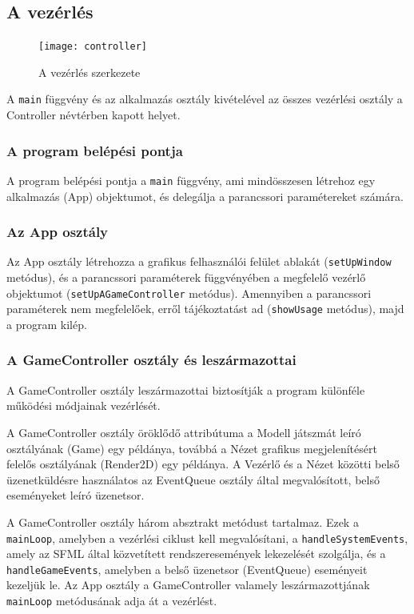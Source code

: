 \documentclass[12pt, twoside]{report}
\begin{document}
\subsection{A vezérlés}

\begin{figure}[b]
	\begin{center}
		\texttt{[image: controller]}
	\end{center}
	\caption{A vezérlés szerkezete}
\end{figure}

A {\tt main} függvény és az alkalmazás osztály kivételével az összes vezérlési osztály a Controller névtérben kapott helyet.

\subsubsection{A program belépési pontja}

A program belépési pontja a {\tt main} függvény, ami mindösszesen létrehoz egy alkalmazás (App) objektumot, és delegálja a parancssori paramétereket számára.

\subsubsection{Az App osztály}

Az App osztály létrehozza a grafikus felhasználói felület ablakát ({\tt setUpWindow} metódus), és a parancssori paraméterek függvényében a megfelelő vezérlő objektumot ({\tt setUpAGameController} metódus). Amennyiben a parancssori paraméterek nem megfelelőek, erről tájékoztatást ad ({\tt showUsage} metódus), majd a program kilép.

\subsubsection{A GameController osztály és leszármazottai}

A GameController osztály leszármazottai biztosítják a program különféle működési módjainak vezérlését. 

A GameController osztály öröklődő attribútuma a Modell játszmát leíró osztályának (Game) egy példánya, továbbá a Nézet grafikus megjelenítésért felelős osztályának (Render2D) egy példánya. A Vezérlő és a Nézet közötti belső üzenetküldésre használatos az EventQueue osztály által megvalósított, belső eseményeket leíró üzenetsor. 

A GameController osztály három absztrakt metódust tartalmaz. Ezek a {\tt mainLoop}, amelyben a vezérlési ciklust kell megvalósítani, a {\tt handleSystemEvents}, amely az SFML által közvetített rendszeresemények lekezelését szolgálja, és a {\tt handleGameEvents}, amelyben a belső üzenetsor (EventQueue) eseményeit kezeljük le. Az App osztály a \break GameController valamely leszármazottjának {\tt mainLoop} metódusának adja át a vezérlést.
\end{document}
